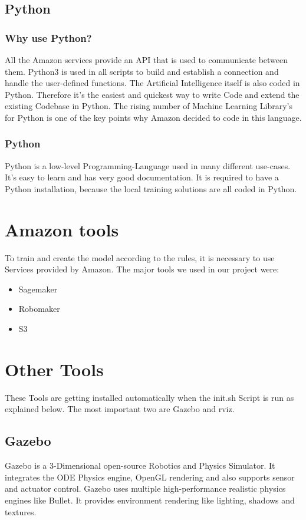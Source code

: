 \subsection{Python}

\subsubsection{Why use Python?}
All the Amazon services provide an API that is used to communicate between them. Python3 is used in all scripts to build and establish a connection and handle the user-defined functions. The Artificial Intelligence itself is also coded in Python. Therefore it's the easiest and quickest way to write Code and extend the existing Codebase in Python. The rising number of Machine Learning Library's for Python is one of the key points why Amazon decided to code in this language.

\subsubsection{Python}
Python is a low-level Programming-Language used in many different use-cases. It's easy to learn and has very good documentation. It is required to have a Python installation, because the local training solutions are all coded in Python. 

\section{Amazon tools}
To train and create the model according to the rules, it is necessary to use Services provided by Amazon. The major tools we used in our project were:

\begin{itemize}
    \item Sagemaker
    \item Robomaker
    \item S3
\end{itemize}


\section{Other Tools}
These Tools are getting installed automatically when the init.sh Script is run as explained below. The most important two are Gazebo and rviz.

\subsection{Gazebo}
Gazebo is a 3-Dimensional open-source Robotics and Physics Simulator. It integrates the ODE Physics engine, OpenGL rendering and also supports sensor and actuator control. Gazebo uses multiple high-performance realistic physics engines like Bullet. It provides environment rendering like lighting, shadows and textures. 

